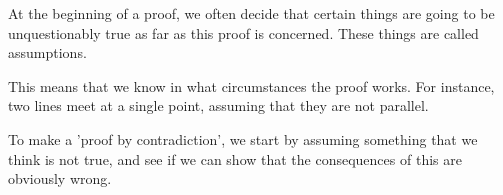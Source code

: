 At the beginning of a proof, we often decide that certain things
are going to be unquestionably true as far as this proof is concerned. 
These things are called assumptions.
\par
This means that we know in what circumstances the proof works.
For instance, two lines meet at a single point, assuming that they are
not parallel.
\par
To make a 'proof by contradiction', we start by assuming something 
that we think is not true, and see if we can show that the consequences
of this are obviously wrong.